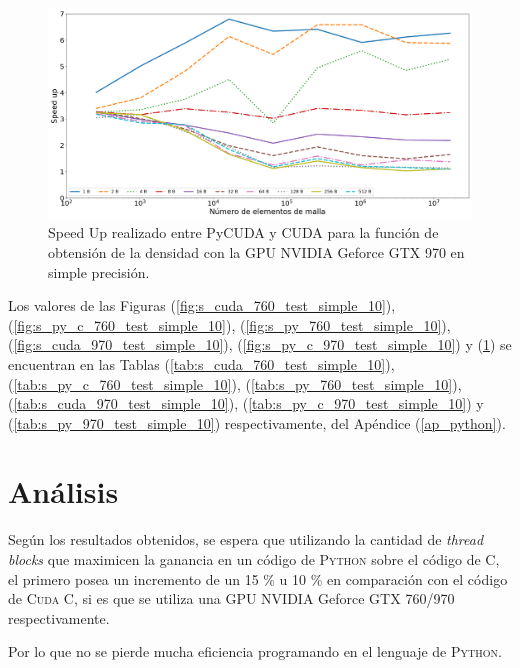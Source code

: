 \begin{figure}[htbp]
	\centering
	\includegraphics[width=\textwidth]{figs/cap4/s_py_970_test_simple_10}
	\caption{Speed Up realizado entre PyCUDA y CUDA para la función de obtensión de la densidad con la GPU NVIDIA Geforce GTX 970 en simple precisión.} 
	\label{fig:s_py_970_test_simple_10}	
\end{figure}

Los valores de las Figuras (\ref{fig:s_cuda_760_test_simple_10}), (\ref{fig:s_py_c_760_test_simple_10}), (\ref{fig:s_py_760_test_simple_10}), (\ref{fig:s_cuda_970_test_simple_10}), (\ref{fig:s_py_c_970_test_simple_10}) y (\ref{fig:s_py_970_test_simple_10}) se encuentran en las Tablas (\ref{tab:s_cuda_760_test_simple_10}), (\ref{tab:s_py_c_760_test_simple_10}), (\ref{tab:s_py_760_test_simple_10}), (\ref{tab:s_cuda_970_test_simple_10}), (\ref{tab:s_py_c_970_test_simple_10}) y (\ref{tab:s_py_970_test_simple_10}) respectivamente, del Apéndice (\ref{ap_python}).
\section{Análisis}

Según los resultados obtenidos, se espera que utilizando la cantidad de \textit{thread blocks} que maximicen la ganancia en un código de \textsc{Python} sobre el código de \textsc{C}, el primero posea un incremento de un  15 \%  u 10 \% en comparación con el código de \textsc{Cuda C}, si es que se utiliza una GPU NVIDIA Geforce GTX 760/970 respectivamente.

Por lo que no se pierde mucha eficiencia programando en el lenguaje de \textsc{Python}.




